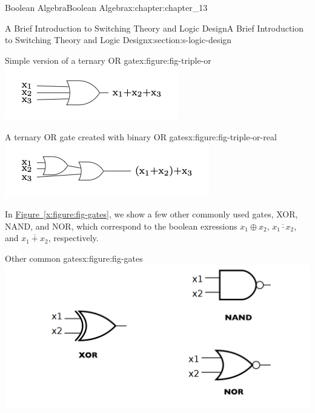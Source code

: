 \documentclass[oneside,10pt,]{book}
\newcommand{\xreffont}{\relax}
\numberwithin{equation}{section}
\begin{document}
\begin{chapterptx}{Boolean Algebra}{}{Boolean Algebra}{}{}{x:chapter:chapter_13}
\begin{sectionptx}{A Brief Introduction to Switching Theory and Logic Design}{}{A Brief Introduction to Switching Theory and Logic Design}{}{}{x:section:s-logic-design}
\begin{sidebyside}{2}{0}{0}{0}%
\begin{sbspanel}{0.5}%
\begin{figureptx}{Simple version of a ternary OR gate}{x:figure:fig-triple-or}{}%
\includegraphics[width=\linewidth]{images/fig-triple-or.png}
\tcblower
\end{figureptx}%
\end{sbspanel}%
\begin{sbspanel}{0.5}%
\begin{figureptx}{A ternary OR gate created with binary OR gates}{x:figure:fig-triple-or-real}{}%
\includegraphics[width=\linewidth]{images/fig-triple-or-real.png}
\tcblower
\end{figureptx}%
\end{sbspanel}%
\end{sidebyside}%
\begin{sidebyside}{2}{0}{0}{0}%
\begin{sbspanel}{0.5}%
In \hyperref[x:figure:fig-gates]{Figure~{\xreffont\ref{x:figure:fig-gates}}}, we show a few other commonly used gates, XOR, NAND, and NOR, which correspond to the boolean exressions \(x_1 \oplus x_2\), \(\overline{x_1 \cdot x_2}\), and \(\overline{x_1 + x_2}\), respectively.%
\end{sbspanel}%
\begin{sbspanel}{0.5}%
\begin{figureptx}{Other common gates}{x:figure:fig-gates}{}%
\includegraphics[width=\linewidth]{images/fig-gates.png}

\end{figureptx}
\end{sbspanel}
\end{sidebyside}
\end{sectionptx}
\end{chapterptx}
\end{document}
